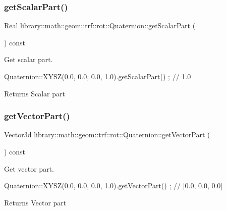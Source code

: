 \subsubsection{\texorpdfstring{get\+Scalar\+Part()}{getScalarPart()}}
{\footnotesize\ttfamily Real library\+::math\+::geom\+::trf\+::rot\+::\+Quaternion\+::get\+Scalar\+Part (\begin{DoxyParamCaption}{ }\end{DoxyParamCaption}) const}



Get scalar part. 


\begin{DoxyCode}
Quaternion::XYSZ(0.0, 0.0, 0.0, 1.0).getScalarPart() ; \textcolor{comment}{// 1.0}
\end{DoxyCode}


\begin{DoxyReturn}{Returns}
Scalar part 
\end{DoxyReturn}
\mbox{\label{classlibrary_1_1math_1_1geom_1_1trf_1_1rot_1_1_quaternion_a3f51bfc8976d79f8d4efb7d32d5a422b}} 
\subsubsection{\texorpdfstring{get\+Vector\+Part()}{getVectorPart()}}
{\footnotesize\ttfamily Vector3d library\+::math\+::geom\+::trf\+::rot\+::\+Quaternion\+::get\+Vector\+Part (\begin{DoxyParamCaption}{ }\end{DoxyParamCaption}) const}



Get vector part. 


\begin{DoxyCode}
Quaternion::XYSZ(0.0, 0.0, 0.0, 1.0).getVectorPart() ; \textcolor{comment}{// [0.0, 0.0, 0.0]}
\end{DoxyCode}


\begin{DoxyReturn}{Returns}
Vector part 
\end{DoxyReturn}
\mbox{\label{classlibrary_1_1math_1_1geom_1_1trf_1_1rot_1_1_quaternion_aa9b6ffe2229886b74b36e715ad53c7be}} 
